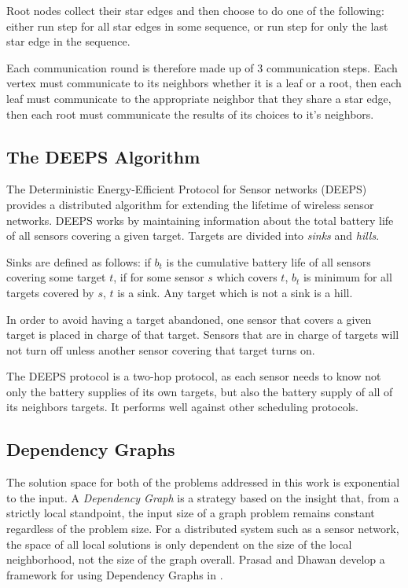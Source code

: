 Root nodes collect their star edges and then choose to do one of the following: either run {\ttfamily step} for all star edges in some sequence, or run {\ttfamily step} for only the last star edge in the sequence. 

Each communication round is therefore made up of 3 communication steps. Each vertex must communicate to its neighbors whether it is a leaf or a root, then each leaf must communicate to the appropriate neighbor that they share a star edge, then each root must communicate the results of its choices to it's neighbors.


\subsection{The DEEPS Algorithm}
\label{sec:deeps}

The Deterministic Energy-Efficient Protocol for Sensor networks (DEEPS) provides a distributed algorithm for extending the lifetime of wireless sensor networks\cite{1640702}. DEEPS works by maintaining information about the total battery life of all sensors covering a given target. Targets are divided into {\em sinks} and {\em hills}. 

Sinks are defined as follows: if $b_t$ is the cumulative battery life of all sensors covering some target $t$, if for some sensor $s$ which covers $t$, $b_t$ is minimum for all targets covered by $s$, $t$ is a sink. Any target which is not a sink is a hill.

In order to avoid having a target abandoned, one sensor that covers a given target is placed in charge of that target. Sensors that are in charge of targets will not turn off unless another sensor covering that target turns on. 

The DEEPS protocol is a two-hop protocol, as each sensor needs to know not only the battery supplies of its own targets, but also the battery supply of all of its neighbors targets. It performs well against other scheduling protocols. 

\subsection{Dependency Graphs}
\label{sec:dep-graphs}

 The solution space for both of the problems addressed in this work is exponential to the input. A {\em Dependency Graph} is a strategy based on the insight that, from a strictly local standpoint, the input size of a graph problem remains constant regardless of the problem size. For a distributed system such as a sensor network, the space of all local solutions is only dependent on the size of the local neighborhood, not the size of the graph overall\cite{978-3-540-77220-0_36}. Prasad and Dhawan develop a framework for using Dependency Graphs in \cite{IPDPS.2008.45361}.

